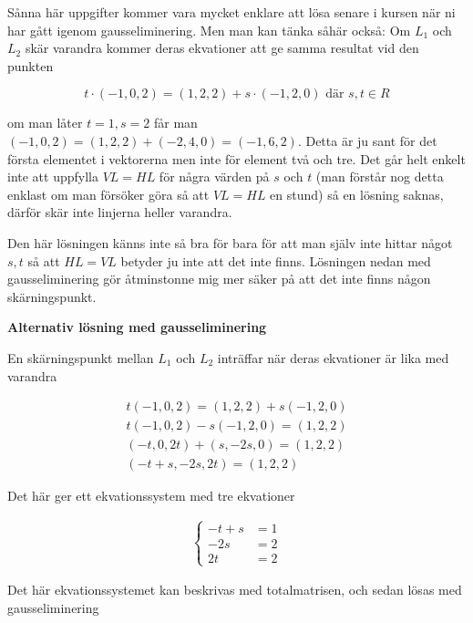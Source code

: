 \documentclass[../../main.tex]{subfiles}
\begin{document}
\begin{solution}{13}

Sånna här uppgifter kommer vara mycket enklare att lösa senare i kursen när ni har gått igenom gausseliminering. Men man kan tänka såhär också: Om $L_1$ och $L_2$ skär varandra kommer deras ekvationer att ge samma resultat vid den punkten

\[t \cdot (-1, 0, 2) = (1, 2, 2) + s \cdot (-1, 2, 0) \text{ där } s, t \in R\]

om man låter $t = 1, s = 2$ får man $(-1, 0, 2) = (1, 2, 2) + (-2, 4, 0) = (-1, 6, 2)$. Detta är ju sant för det första elementet i vektorerna men inte för element två och tre. Det går helt enkelt inte att uppfylla $VL = HL$ för några värden på $s$ och $t$ (man förstår nog detta enklast om man försöker göra så att $VL = HL$ en stund) så en lösning saknas, därför skär inte linjerna heller varandra.

Den här lösningen känns inte så bra för bara för att man själv inte hittar något $s,t$ så att $HL=VL$ betyder ju inte att det inte finns. Lösningen nedan med gausseliminering gör åtminstonne mig mer säker på att det inte finns någon skärningspunkt.

\textbf{Alternativ lösning med gausseliminering}

En skärningspunkt mellan $L_1$ och $L_2$ inträffar när deras ekvationer är lika med varandra

\begin{align*}
    t(-1, 0, 2) = (1, 2, 2) + s(-1, 2, 0)\\
    t(-1, 0, 2) - s(-1, 2, 0)= (1, 2, 2)\\
    (-t, 0, 2t) + (s, -2s, 0)=(1, 2, 2)\\
    (-t+s, -2s, 2t) = (1, 2, 2)
\end{align*}

Det här ger ett ekvationssystem med tre ekvationer

\begin{align*}
    \begin{cases} 
        -t+s&=1  \\
        -2s &= 2 \\
        2t &= 2
    \end{cases}
\end{align*}

Det här ekvationssystemet kan beskrivas med totalmatrisen, och sedan lösas med gausseliminering



\end{solution}
\end{document}
